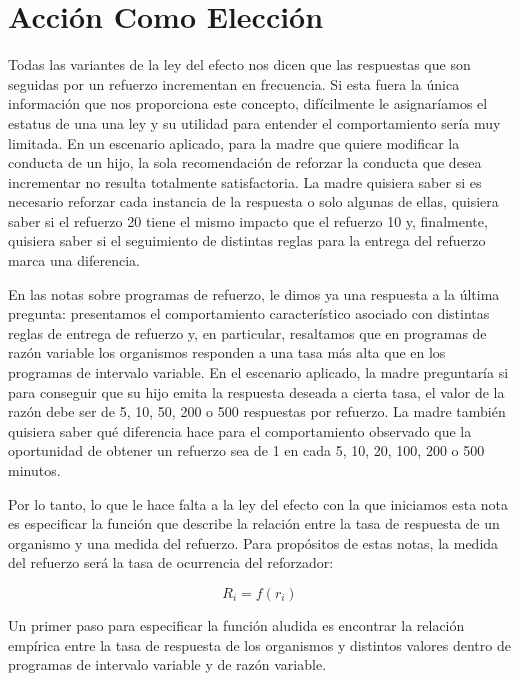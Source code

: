 \documentclass[
  a4paper,
  DIV=11,
  numbers=noendperiod]{scrreprt}
\begin{document}

\chapter{Acción Como Elección}\label{acciuxf3n-como-elecciuxf3n}

Todas las variantes de la ley del efecto nos dicen que las respuestas
que son seguidas por un refuerzo incrementan en frecuencia. Si esta
fuera la única información que nos proporciona este concepto,
difícilmente le asignaríamos el estatus de una una ley y su utilidad
para entender el comportamiento sería muy limitada. En un escenario
aplicado, para la madre que quiere modificar la conducta de un hijo, la
sola recomendación de reforzar la conducta que desea incrementar no
resulta totalmente satisfactoria. La madre quisiera saber si es
necesario reforzar cada instancia de la respuesta o solo algunas de
ellas, quisiera saber si el refuerzo 20 tiene el mismo impacto que el
refuerzo 10 y, finalmente, quisiera saber si el seguimiento de distintas
reglas para la entrega del refuerzo marca una diferencia.

En las notas sobre programas de refuerzo, le dimos ya una respuesta a la
última pregunta: presentamos el comportamiento característico asociado
con distintas reglas de entrega de refuerzo y, en particular, resaltamos
que en programas de razón variable los organismos responden a una tasa
más alta que en los programas de intervalo variable. En el escenario
aplicado, la madre preguntaría si para conseguir que su hijo emita la
respuesta deseada a cierta tasa, el valor de la razón debe ser de 5, 10,
50, 200 o 500 respuestas por refuerzo. La madre también quisiera saber
qué diferencia hace para el comportamiento observado que la oportunidad
de obtener un refuerzo sea de 1 en cada 5, 10, 20, 100, 200 o 500
minutos.

Por lo tanto, lo que le hace falta a la ley del efecto con la que
iniciamos esta nota es especificar la función que describe la relación
entre la tasa de respuesta de un organismo y una medida del refuerzo.
Para propósitos de estas notas, la medida del refuerzo será la tasa de
ocurrencia del reforzador:

\[R_i = f (r_i)\]

Un primer paso para especificar la función aludida es encontrar la
relación empírica entre la tasa de respuesta de los organismos y
distintos valores dentro de programas de intervalo variable y de razón
variable.
\end{document}
